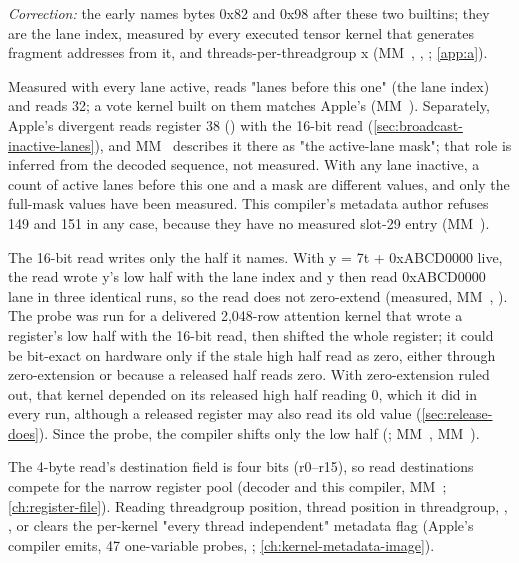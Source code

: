 \emph{Correction:} the early  names bytes 0x82
and 0x98 after these two builtins; they are the lane index, measured by every executed tensor kernel that generates
fragment addresses from it, and threads-per-threadgroup x (MM~, ,
; \cref{app:a}).

Measured with every lane active,  reads "lanes before
this one" (the lane index) and  reads 32; a vote kernel built on them matches Apple's 
(MM~). Separately, Apple's divergent  reads register 38 () with the 16-bit read
(\cref{sec:broadcast-inactive-lanes}), and MM~ describes it there as "the active-lane mask"; that role is inferred from the decoded
sequence, not measured. With any lane inactive, a count of active lanes before this one and a mask are different values, and only the
full-mask values have been measured. This compiler's metadata
author refuses 149 and 151 in any case, because they have no measured slot-29 entry (MM~).

The 16-bit read writes only the half it names. With y = 7t +
0xABCD0000 live, the read wrote y's low half with the lane index and y then read 0xABCD0000 \textbar{} lane in three identical runs, so
the read does not zero-extend (measured, MM~, ). The probe was
run for a delivered 2,048-row attention kernel that wrote a register's low half with the 16-bit read, then shifted the
whole register; it could be bit-exact on hardware only if the stale high half read as zero, either through zero-extension
or because a released half reads zero. With zero-extension ruled out, that kernel depended on its released
high half reading 0, which it did in every run, although a released register may also read its old value (\cref{sec:release-does}). Since the
probe, the compiler shifts only the low half (; MM~, MM~).

The 4-byte read's destination field is four bits (r0–r15), so read destinations compete for the narrow register pool
(decoder and this compiler, MM~; \cref{ch:register-file}). Reading threadgroup position, thread position in
threadgroup, , ,  or  clears the per-kernel
"every thread independent" metadata flag (Apple's compiler emits, 47 one-variable probes, ;
\cref{ch:kernel-metadata-image}).

